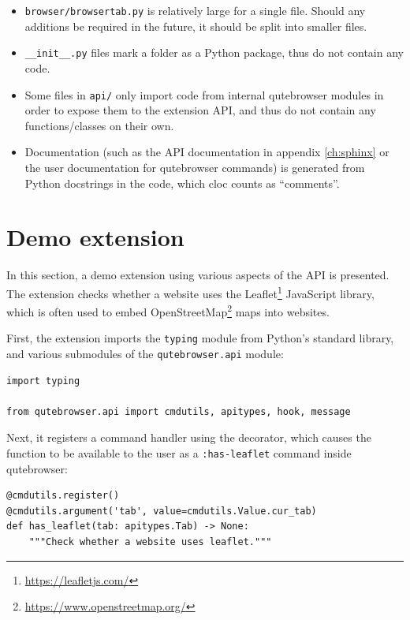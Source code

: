 \begin{itemize}[parsep=5pt]

  \item \verb|browser/browsertab.py| is relatively large for a single file.
    Should any additions be required in the future, it should be split into smaller
    files.
  \item \verb|__init__.py| files mark a folder as a Python package, thus
    do not contain any code.
  \item Some files in \verb|api/| only import code from internal
    qutebrowser modules in order to expose them to the extension API, and thus
    do not contain any functions/classes on their own.
  \item Documentation (such as the API documentation in appendix \ref{ch:sphinx}
    or the user documentation for qutebrowser commands) is generated from
    Python docstrings in the code, which cloc counts as ``comments''.
\end{itemize}

\section{Demo extension}
In this section, a demo extension using various aspects of the API is
presented. The extension checks whether a website uses the
Leaflet\footnote{\url{https://leafletjs.com/}} JavaScript library, which is
often used to embed OpenStreetMap\footnote{\url{https://www.openstreetmap.org/}}
maps into websites.

First, the extension imports the \verb|typing| module from Python's standard
library, and various submodules of the \verb|qutebrowser.api| module:

\begin{verbatim}
import typing

from qutebrowser.api import cmdutils, apitypes, hook, message
\end{verbatim}

Next, it registers a command handler using the 
decorator, which causes the function to be available to the user as a
\verb|:has-leaflet| command inside qutebrowser:

\begin{verbatim}
@cmdutils.register()
@cmdutils.argument('tab', value=cmdutils.Value.cur_tab)
def has_leaflet(tab: apitypes.Tab) -> None:
    """Check whether a website uses leaflet."""
\end{verbatim}

